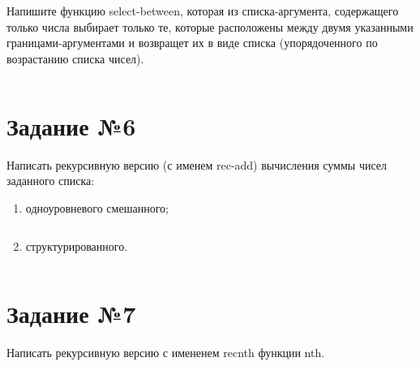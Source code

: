 Напишите функцию select-between, которая из списка-аргумента, содержащего только
числа выбирает только те, которые расположены между двумя указанными
границами-аргументами и возвращет их в виде списка (упорядоченного по
возрастанию списка чисел).

\vspace{4mm}
\begin{minipage}{0.92\linewidth}
\begin{lstlisting}
\end{lstlisting}
\end{minipage}

\section{Задание №6}

Написать рекурсивную версию (с именем rec-add) вычисления суммы чисел
заданного списка: 
\begin{enumerate}
    \item одноуровневого смешанного;

\vspace{4mm}
\begin{minipage}{0.92\linewidth}
\begin{lstlisting}
\end{lstlisting}
\end{minipage}

    \item структурированного.

\vspace{4mm}
\begin{minipage}{0.92\linewidth}
\begin{lstlisting}
\end{lstlisting}
\end{minipage}

\end{enumerate}

\section{Задание №7}

Написать рекурсивную версию с имененем recnth функции nth.

\vspace{4mm}
\begin{minipage}{0.92\linewidth}
\begin{lstlisting}
\end{lstlisting}
\end{minipage}

